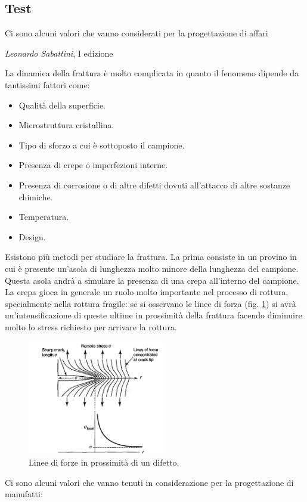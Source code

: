 \subsection{Test}

\epigraph{Ci sono alcuni valori che vanno considerati per la progettazione di affari}{\textit{Leonardo Sabattini}, I edizione}

La dinamica della frattura è molto complicata in quanto il fenomeno dipende da tantissimi fattori come:
\begin{itemize}
    \item Qualità della superficie.
    \item Microstruttura cristallina.
    \item Tipo di sforzo a cui è sottoposto il campione.
    \item Presenza di crepe o imperfezioni interne.
    \item Presenza di corrosione o di altre difetti dovuti all'attacco di altre sostanze chimiche.
    \item Temperatura.
    \item Design.
\end{itemize}
Esistono più metodi per studiare la frattura. La prima consiste in un provino in cui è presente un'asola di lunghezza molto minore della lunghezza del campione. Questa asola andrà a simulare la presenza di una crepa all'interno del campione. La crepa gioca in generale un ruolo molto importante nel processo di rottura, specialmente nella rottura fragile: se si osservano le linee di forza (fig. \ref{crack}) si avrà un'intensificazione di queste ultime in prossimità della frattura facendo diminuire molto lo stress richiesto per arrivare la rottura. 

\begin{figure}[h]
    \centering
    \includegraphics[width=6cm]{frattura/craks.png}
    \caption{Linee di forze in prossimità di un difetto.}
    \label{crack}
\end{figure}

Ci sono alcuni valori che vanno tenuti in considerazione per la progettazione di manufatti:

